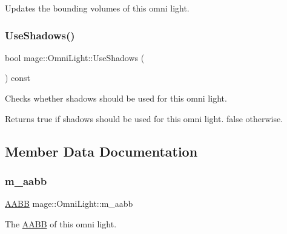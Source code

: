 Updates the bounding volumes of this omni light. \hypertarget{classmage_1_1_omni_light_a8d58e7e1b26e54b3d9785ca79213cc4f}{}\label{classmage_1_1_omni_light_a8d58e7e1b26e54b3d9785ca79213cc4f} 
\subsubsection{\texorpdfstring{Use\+Shadows()}{UseShadows()}}
{\footnotesize\ttfamily bool mage\+::\+Omni\+Light\+::\+Use\+Shadows (\begin{DoxyParamCaption}{ }\end{DoxyParamCaption}) const\hspace{0.3cm}{\ttfamily [noexcept]}}

Checks whether shadows should be used for this omni light.

\begin{DoxyReturn}{Returns}
{\ttfamily true} if shadows should be used for this omni light. {\ttfamily false} otherwise. 
\end{DoxyReturn}


\subsection{Member Data Documentation}
\hypertarget{classmage_1_1_omni_light_a9563f91a80b35fd4f9a7f73721457a8a}{}\label{classmage_1_1_omni_light_a9563f91a80b35fd4f9a7f73721457a8a} 
\subsubsection{\texorpdfstring{m\+\_\+aabb}{m\_aabb}}
{\footnotesize\ttfamily \hyperlink{classmage_1_1_a_a_b_b}{A\+A\+BB} mage\+::\+Omni\+Light\+::m\+\_\+aabb\hspace{0.3cm}{\ttfamily [private]}}

The \hyperlink{classmage_1_1_a_a_b_b}{A\+A\+BB} of this omni light. \hypertarget{classmage_1_1_omni_light_ae48ee8d67341912519d793ec76269ab3}{}\label{classmage_1_1_omni_light_ae48ee8d67341912519d793ec76269ab3} 
